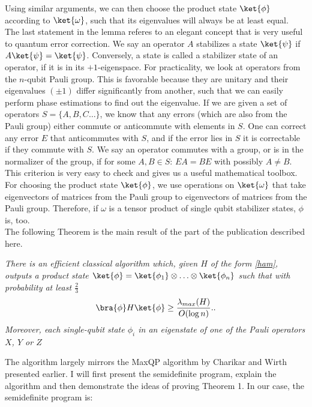 Using similar arguments, we can then choose the product state $\ket{\phi}$ according to $\ket{\omega}$, such that its eigenvalues will always be at least equal.\\
The last statement in the lemma referes to an elegant concept that is very useful to quantum error correction.
We say an operator $A$ stabilizes a state $\ket{\psi}$ if $A\ket{\psi}=\ket{\psi}$.
Conversely, a state is called a stabilizer state of an operator, if it is in its $+1$-eigenspace.
For practicality, we look at operators from the $n$-qubit Pauli group.
This is favorable because they are unitary and their eigenvalues  $(\pm 1)$ differ significantly from another, such that we can easily perform phase estimations to find out the eigenvalue.
If we are given a set of operators $S=\{A,B,C\ldots\}$, we know that any errors (which are also from the Pauli group) either commute or anticommute with elements in $S$.
One can correct any error $E$ that anticommutes with $S$, and if the error lies in $S$ it is correctable if they commute with $S$.\cite{gottesman97}
We say an operator commutes with a group, or is in the normalizer of the group, if for some $A,B\in S$: $EA=BE$ with possibly $A\neq B$.
This criterion is very easy to check and gives us a useful mathematical toolbox.
For choosing the product state $\ket{\phi}$, we use operations on $\ket{\omega}$ that take eigenvectors of matrices from the Pauli group to eigenvectors of matrices from the Pauli group.
Therefore, if $\omega$ is a tensor product of single qubit stabilizer states, $\phi$ is, too.\\
The following Theorem is the main result of the part of the publication described here.
\begin{thm}\emph{
		There is an efficient classical algorithm which, given $H$ of the form \eqref{ham}, outputs a product state $\ket{\phi} = \ket{\phi_1}\otimes\ldots\otimes \ket{\phi_n}$ such that with probability at least $\frac{2}{3}$ \[
			\bra{\phi}H\ket{\phi}\ge \frac{\lambda_{max}(H)}{O(\log{}n)}.
		.\]
		Moreover, each single-qubit state $\phi_i$ in an eigenstate of one of the Pauli operators $X$, $Y$ or $Z$
}\end{thm}
The algorithm largely mirrors the MaxQP algorithm by Charikar and Wirth presented earlier.
I will first present the semidefinite program, explain the algorithm and then demonstrate the ideas of proving Theorem 1.
In our case, the semidefinite program is:
